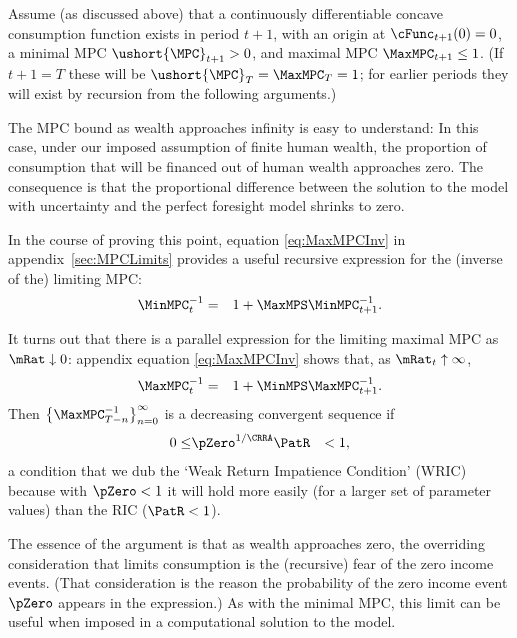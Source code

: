 \documentclass[titlepage]{\econtex}\providecommand{\texname}{BufferStockTheory}%
\begin{document}
\newcommand{\NewMaxMinMPC}{\ushort{\MPC}}

Assume (as discussed above) that a continuously differentiable
concave consumption function exists in period $t+1$, with an origin at
$\cFunc_{t+1}(0)=0$, a minimal MPC $\NewMaxMinMPC_{t+1}>0$, and
maximal MPC $\MaxMPC_{t+1} \leq 1$.  (If $t+1 = T$ these will be
$\NewMaxMinMPC_{T}=\MaxMPC_{T}=1$; for earlier periods they will exist
by recursion from the following arguments.)

The MPC bound as wealth approaches infinity is easy to understand: In this case,
under our imposed assumption of finite human wealth, the proportion of consumption
that will be financed out of human wealth approaches zero. The
consequence is that the proportional difference between the solution to the
model with uncertainty and the perfect foresight model shrinks to zero.

In the course of proving this point, equation \eqref{eq:MaxMPCInv} in appendix~\ref{sec:MPCLimits}  provides a useful recursive expression for the (inverse of the) limiting MPC:
\begin{eqnarray}
 \MinMPC_{t}^{-1} & = & 1+\MaxMPS \MinMPC_{t+1}^{-1} \label{eq:MinMPCInv}.
\end{eqnarray}

\hypertarget{WRIC}{}
It turns out that there is a parallel expression for the limiting maximal 
MPC as $\mRat \downarrow 0$: appendix equation \eqref{eq:MaxMPCInv}  shows that, as $\mRat_{t} \uparrow \infty$,
\begin{eqnarray}
 \MaxMPC_{t}^{-1} & = & 1+\MinMPS \MaxMPC_{t+1}^{-1} \label{eq:MaxMPCInv}.
\end{eqnarray}
Then
$\left\{\MaxMPC_{T-n}^{-1}\right\} _{n=0}^{\infty}$ is a decreasing %
convergent sequence if
\begin{eqnarray}
  0 \leq & \pZero^{1/\CRRA} \PatR & < 1 \label{eq:WRIC},
\end{eqnarray}
a condition that we dub the `Weak Return Impatience Condition' (WRIC)
because with $\pZero < 1$ it will hold more easily (for a larger set of parameter
values) than the RIC ($\PatR < 1$).

The essence of the argument is that as wealth approaches zero, the overriding
consideration that limits consumption is the (recursive) fear of the zero
income events.  (That consideration is the reason the probability of the zero
income event $\pZero$ appears in the expression.)  As with the minimal
MPC, this limit can be useful when imposed in a computational solution to the model.
\end{document}
